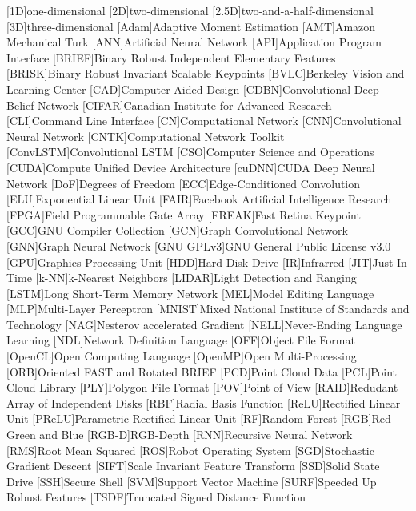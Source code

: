 \begin{acronym}
	[1D]{one-dimensional}
	[2D]{two-dimensional}
	[2.5D]{two-and-a-half-dimensional}
	[3D]{three-dimensional}
	[Adam]{Adaptive Moment Estimation}
	[AMT]{Amazon Mechanical Turk}
	[ANN]{Artificial Neural Network}
	[API]{Application Program Interface}
	[BRIEF]{Binary Robust Independent Elementary Features}
	[BRISK]{Binary Robust Invariant Scalable Keypoints}
	[BVLC]{Berkeley Vision and Learning Center}
	[CAD]{Computer Aided Design}
	[CDBN]{Convolutional Deep Belief Network}
	[CIFAR]{Canadian Institute for Advanced Research}
	[CLI]{Command Line Interface}
	[CN]{Computational Network}
	[CNN]{Convolutional Neural Network}
    [CNTK]{Computational Network Toolkit}
    [ConvLSTM]{Convolutional LSTM}
	[CSO]{Computer Science and Operations}
	[CUDA]{Compute Unified Device Architecture}
    [cuDNN]{CUDA Deep Neural Network}
    [DoF]{Degrees of Freedom}
    [ECC]{Edge-Conditioned Convolution}
    [ELU]{Exponential Linear Unit}
	[FAIR]{Facebook Artificial Intelligence Research}
	[FPGA]{Field Programmable Gate Array}
	[FREAK]{Fast Retina Keypoint}
    [GCC]{GNU Compiler Collection}
    [GCN]{Graph Convolutional Network}
    [GNN]{Graph Neural Network}
	[GNU GPLv3]{GNU General Public License v3.0}
	[GPU]{Graphics Processing Unit}
	[HDD]{Hard Disk Drive}
	[IR]{Infrarred}
    [JIT]{Just In Time}
    [k-NN]{k-Nearest Neighbors}
    [LIDAR]{Light Detection and Ranging}
    [LSTM]{Long Short-Term Memory Network}
	[MEL]{Model Editing Language}
	[MLP]{Multi-Layer Perceptron}
	[MNIST]{Mixed National Institute of Standards and Technology}
    [NAG]{Nesterov accelerated Gradient}
    [NELL]{Never-Ending Language Learning}
	[NDL]{Network Definition Language}
	[OFF]{Object File Format}
	[OpenCL]{Open Computing Language}
	[OpenMP]{Open Multi-Processing}
	[ORB]{Oriented FAST and Rotated BRIEF}
	[PCD]{Point Cloud Data}
    [PCL]{Point Cloud Library}
    [PLY]{Polygon File Format}
	[POV]{Point of View}
	[RAID]{Redudant Array of Independent Disks}
	[RBF]{Radial Basis Function}
	[ReLU]{Rectified Linear Unit}
    [PReLU]{Parametric Rectified Linear Unit}
    [RF]{Random Forest}
	[RGB]{Red Green and Blue}
    [RGB-D]{RGB-Depth}
	[RNN]{Recursive Neural Network}
    [RMS]{Root Mean Squared}
    [ROS]{Robot Operating System}
	[SGD]{Stochastic Gradient Descent}
	[SIFT]{Scale Invariant Feature Transform}
	[SSD]{Solid State Drive}
	[SSH]{Secure Shell}
	[SVM]{Support Vector Machine}
	[SURF]{Speeded Up Robust Features}
	[TSDF]{Truncated Signed Distance Function}
\end{acronym}
